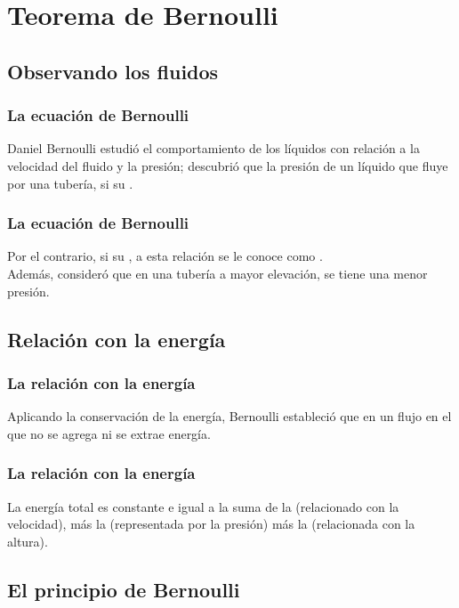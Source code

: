 \documentclass[14pt]{beamer}
\begin{document}
\section{Teorema de Bernoulli}
\subsection{Observando los fluidos}

\begin{frame}
\frametitle{La ecuación de Bernoulli}
Daniel Bernoulli estudió el comportamiento de los líquidos con relación a la velocidad del fluido y la presión; descubrió que la presión de un líquido que fluye por una tubería,  si su .
\end{frame}
\begin{frame}
\frametitle{La ecuación de Bernoulli}
Por el contrario,  si su , \pause a esta relación se le conoce como .
\\
\bigskip
\pause
Además, consideró que en una tubería a mayor elevación, se tiene una menor presión.
\end{frame}

\subsection{Relación con la energía}

\begin{frame}
\frametitle{La relación con la energía}
Aplicando la conservación de la energía, Bernoulli estableció que en un flujo en el que no se agrega ni se extrae energía.
\end{frame}
\begin{frame}
\frametitle{La relación con la energía}
La energía total es constante e igual a la suma de la  (relacionado con la velocidad), \pause más la  (representada por la presión) \pause más la  (relacionada con la altura).
\end{frame}

\subsection{El principio de Bernoulli}
\end{document}
